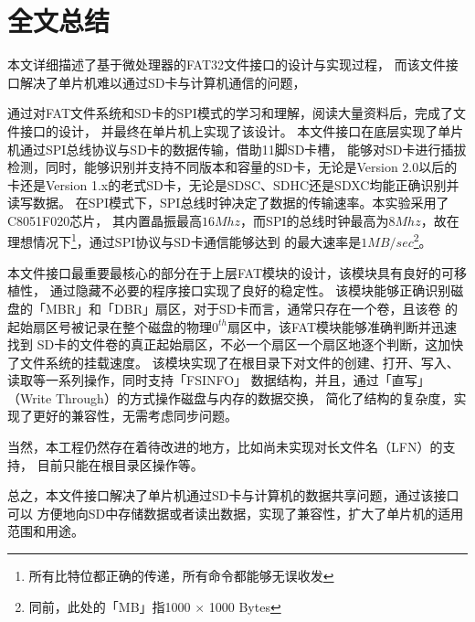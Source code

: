 
\chapter{全文总结}
\label{chap:Summary}

本文详细描述了基于微处理器的FAT32文件接口的设计与实现过程，
而该文件接口解决了单片机难以通过SD卡与计算机通信的问题，

通过对FAT文件系统和SD卡的SPI模式的学习和理解，阅读大量资料后，完成了文件接口的设计，
并最终在单片机上实现了该设计。
本文件接口在底层实现了单片机通过SPI总线协议与SD卡的数据传输，借助11脚SD卡槽，
能够对SD卡进行插拔检测，同时，能够识别并支持不同版本和容量的SD卡，无论是Version 2.0以后的卡还是Version 1.x的老式SD卡，无论是SDSC、SDHC还是SDXC均能正确识别并读写数据。
在SPI模式下，SPI总线时钟决定了数据的传输速率。本实验采用了C8051F020芯片，
其内置晶振最高$16Mhz$，而SPI的总线时钟最高为$8Mhz$，故在理想情况下\footnote{
    所有比特位都正确的传递，所有命令都能够无误收发}，通过SPI协议与SD卡通信能够达到
的最大速率是$1MB/sec$\footnote{同前，此处的「MB」指1000 $\times$ 1000 Bytes}。

本文件接口最重要最核心的部分在于上层FAT模块的设计，该模块具有良好的可移植性，
通过隐藏不必要的程序接口实现了良好的稳定性。
该模块能够正确识别磁盘的「MBR」和「DBR」扇区，对于SD卡而言，通常只存在一个卷，且该卷
的起始扇区号被记录在整个磁盘的物理$0^{th}$扇区中，该FAT模块能够准确判断并迅速找到
SD卡的文件卷的真正起始扇区，不必一个扇区一个扇区地逐个判断，这加快了文件系统的挂载速度。
该模块实现了在根目录下对文件的创建、打开、写入、读取等一系列操作，同时支持「FSINFO」
数据结构，并且，通过「直写」（Write Through）的方式操作磁盘与内存的数据交换，
简化了结构的复杂度，实现了更好的兼容性，无需考虑同步问题。

当然，本工程仍然存在着待改进的地方，比如尚未实现对长文件名（LFN）的支持，
目前只能在根目录区操作等。

总之，本文件接口解决了单片机通过SD卡与计算机的数据共享问题，通过该接口可以
方便地向SD中存储数据或者读出数据，实现了兼容性，扩大了单片机的适用范围和用途。

